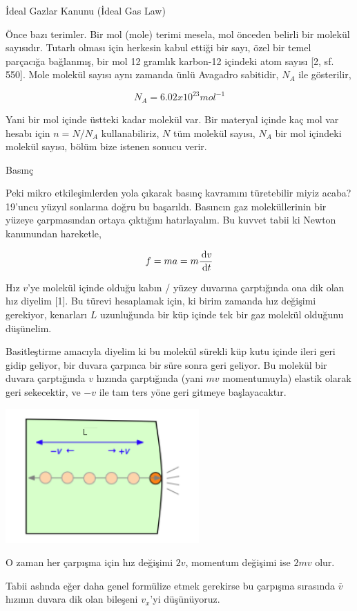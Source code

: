 \documentclass[12pt,fleqn]{article}\usepackage{../../common}
\begin{document}
İdeal Gazlar Kanunu (İdeal Gas Law)

Önce bazı terimler. Bir mol (mole) terimi mesela, mol önceden belirli bir
molekül sayısıdır. Tutarlı olması için herkesin kabul ettiği bir sayı, özel bir
temel parçacığa bağlanmış, bir mol 12 gramlık karbon-12 içindeki atom sayısı
[2, sf. 550]. Mole molekül sayısı aynı zamanda ünlü Avagadro sabitidir,
$N_A$ ile gösterilir,

$$
N_A = 6.02 x 10^{23} mol^{-1}
$$

Yani bir mol içinde üstteki kadar molekül var. Bir materyal içinde kaç mol var
hesabı için $n = N / N_A$ kullanabiliriz, $N$ tüm molekül sayısı, $N_A$ bir mol
içindeki molekül sayısı, bölüm bize istenen sonucu verir.

Basınç

Peki mikro etkileşimlerden yola çıkarak basınç kavramını türetebilir miyiz
acaba? 19'uncu yüzyıl sonlarına doğru bu başarıldı. Basıncın gaz moleküllerinin
bir yüzeye çarpmasından ortaya çıktığını hatırlayalım. Bu kuvvet tabii ki Newton
kanunundan hareketle,

$$
f = m a = m \frac{\,\mathrm{d} v}{\,\mathrm{d} t}
$$

Hız $v$'ye molekül içinde olduğu kabın / yüzey duvarına çarptığında ona dik olan
hız diyelim [1]. Bu türevi hesaplamak için, ki birim zamanda hız değişimi
gerekiyor, kenarları $L$ uzunluğunda bir küp içinde tek bir gaz molekül olduğunu
düşünelim.

Basitleştirme amacıyla diyelim ki bu molekül sürekli küp kutu içinde ileri geri
gidip geliyor, bir duvara çarpınca bir süre sonra geri geliyor. Bu molekül bir
duvara çarptığında $v$ hızında çarptığında (yani $mv$ momentumuyla) elastik
olarak geri sekecektir, ve $-v$ ile tam ters yöne geri gitmeye başlayacaktır.

\includegraphics[width=20em]{phy_005_basics_04.png}

O zaman her çarpışma için hız değişimi $2v$, momentum değişimi ise $2mv$
olur.

Tabii aslında eğer daha genel formülize etmek gerekirse bu çarpışma sırasında
$\bar{v}$ hızının duvara dik olan bileşeni $v_x$'yi düşünüyoruz.
\end{document}
